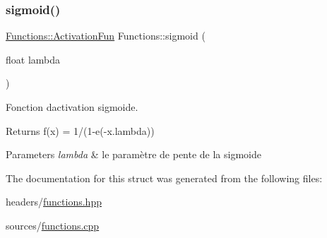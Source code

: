 \subsubsection{\texorpdfstring{sigmoid()}{sigmoid()}}
{\footnotesize\ttfamily \hyperlink{structFunctions_ad25362ffa52b2f7933431190546593ac}{Functions\+::\+Activation\+Fun} Functions\+::sigmoid (\begin{DoxyParamCaption}\item[{float}]{lambda }\end{DoxyParamCaption})\hspace{0.3cm}{\ttfamily [static]}}



Fonction d\textquotesingle{}activation sigmoide. 

\begin{DoxyReturn}{Returns}
f(x) = 1/(1-\/e(-\/x.\+lambda)) 
\end{DoxyReturn}

\begin{DoxyParams}{Parameters}
{\em lambda} & le paramètre de pente de la sigmoide \\
\hline
\end{DoxyParams}


The documentation for this struct was generated from the following files\+:\begin{DoxyCompactItemize}
\item 
headers/\hyperlink{functions_8hpp}{functions.\+hpp}\item 
sources/\hyperlink{functions_8cpp}{functions.\+cpp}\end{DoxyCompactItemize}
